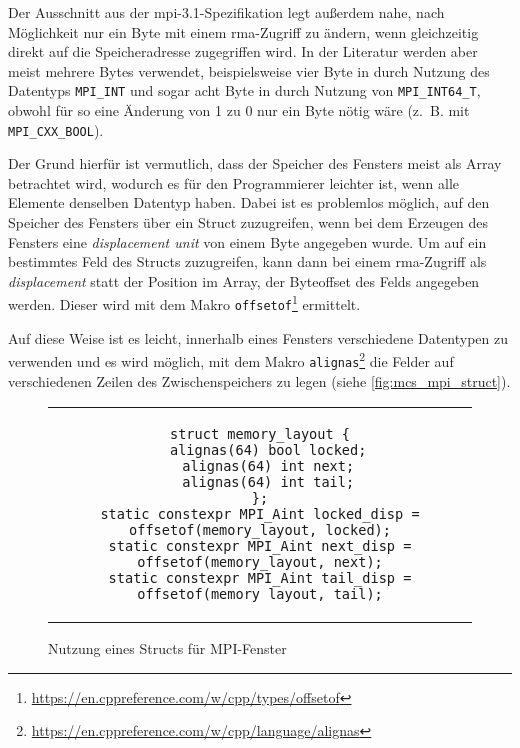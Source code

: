 Der Ausschnitt aus der \gls{mpi}-3.1-Spezifikation legt außerdem nahe,
nach Möglichkeit nur ein Byte mit einem \gls{rma}-Zugriff zu ändern,
wenn gleichzeitig direkt auf die Speicheradresse zugegriffen wird.
In der Literatur werden aber meist mehrere Bytes verwendet,
beispielsweise vier Byte in \cite{AdvancedMpi} durch Nutzung des Datentyps \texttt{MPI\_INT}
und sogar acht Byte in \cite{RMA-RW} durch Nutzung von \texttt{MPI\_INT64\_T},
obwohl für so eine Änderung von 1 zu 0 nur ein Byte nötig wäre (z.~B. mit \texttt{MPI\_CXX\_BOOL}).

Der Grund hierfür ist vermutlich,
dass der Speicher des \gls{Fenster}s meist als Array betrachtet wird,
wodurch es für den Programmierer leichter ist,
wenn alle Elemente denselben Datentyp haben.
Dabei ist es problemlos möglich,
auf den Speicher des \gls{Fenster}s über ein Struct zuzugreifen,
wenn bei dem Erzeugen des \gls{Fenster}s eine \textit{displacement unit} von einem Byte angegeben wurde.
Um auf ein bestimmtes Feld des Structs zuzugreifen,
kann dann bei einem \gls{rma}-Zugriff als \textit{displacement} statt der Position im Array,
der Byteoffset des Felds angegeben werden.
Dieser wird mit dem Makro \texttt{offsetof}\footnote{\url{https://en.cppreference.com/w/cpp/types/offsetof}} ermittelt.

Auf diese Weise ist es leicht,
innerhalb eines \gls{Fenster}s verschiedene Datentypen zu verwenden und es wird möglich,
mit dem Makro \texttt{alignas}\footnote{\url{https://en.cppreference.com/w/cpp/language/alignas}}
die Felder auf verschiedenen Zeilen des \gls{Zwischenspeicher}s zu legen (siehe \autoref{fig:mcs_mpi_struct}).

\begin{figure}[h]
    \centering
    \begin{tabular}{c}\begin{lstlisting}
struct memory_layout {
  alignas(64) bool locked;
  alignas(64) int next;
  alignas(64) int tail;
};
static constexpr MPI_Aint locked_disp = offsetof(memory_layout, locked);
static constexpr MPI_Aint next_disp = offsetof(memory_layout, next);
static constexpr MPI_Aint tail_disp = offsetof(memory_layout, tail);
    \end{lstlisting}\end{tabular}
    \caption{Nutzung eines Structs für MPI-Fenster}
    \label{fig:mcs_mpi_struct}
\end{figure}

